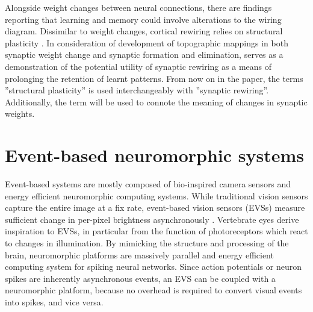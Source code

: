 \documentclass[letterpaper, 10 pt, conference]{ieeeconf}  %
\begin{document}



Alongside weight changes between neural connections, there are findings reporting that learning and memory  could involve alterations to the wiring diagram. %
Dissimilar to weight changes, cortical rewiring relies on structural plasticity \cite{Chklovskii2004b}.
In consideration of development of topographic mappings in both synaptic weight change and synaptic formation and elimination, \cite{bamford2010synaptic} serves as a demonstration of the potential utility of synaptic rewiring as a means of prolonging the retention of learnt patterns.
From now on in the paper, the terms ''structural plasticity'' is used interchangeably with ''synaptic rewiring''.
Additionally, the term will be used to connote the meaning of changes in synaptic weights.


\section{Event-based neuromorphic systems}

Event-based systems are mostly composed of bio-inspired camera sensors and energy efficient neuromorphic computing systems. 
While traditional vision sensors capture the entire image at a fix rate, event-based vision sensors (EVSs) measure sufficient change in per-pixel brightness asynchronously \cite{Gallego2019}.
Vertebrate eyes derive inspiration to EVSs, in particular from the function of photoreceptors which react to changes in illumination.
By mimicking the structure and processing of the brain, neuromorphic platforms are massively parallel and energy efficient computing system for spiking neural networks.
Since action potentials or neuron spikes are inherently asynchronous events, an EVS can be coupled with a neuromorphic platform, because no overhead is required to convert visual events into spikes, and vice versa.
\end{document}
